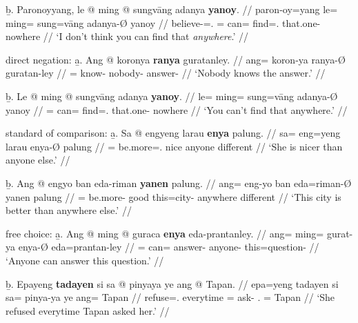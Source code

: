	\b{b.} \begingl
		\gla Paronoyyang, le @ ming @ sungvāng adanya \textbf{yanoy}. //
		\glb paron-oy=yang le= ming= sung=vāng adanya-Ø yanoy //
		\glc believe-\Neg{}=\Fsg{}.\Aarg{} \PatTI{}= can= 
			find=\Second{}.\Aarg{} that.one-\Top{} nowhere //
		\glft `I don't think you can find that \emph{anywhere}.' //
		\endgl
	\endsubsub

\a direct negation:\vspace{.5em} %
	\beginsubsub
	\b{a.} \begingl
		\gla Ang @ koronya \textbf{ranya} guratanley. //
		\glb ang= koron-ya ranya-Ø guratan-ley //
		\glc \AgtT{}= know-\TsgM{} nobody-\Top{} answer-\PargI{} //
		\glft `Nobody knows the answer.' //
		\endgl\vspace{.5em}
		
	\b{b.} \begingl
		\gla Le @ ming @ sungvāng adanya \textbf{yanoy}. //
		\glb le= ming= sung=vāng adanya-Ø yanoy //
		\glc \PatTI{}= can= find=\Second{}.\Aarg{} that.one-\Top{} nowhere //
		\glft `You can't find that anywhere.' //
		\endgl
	\endsubsub

\a standard of comparison:\vspace{.5em} %
	\beginsubsub
	\b{a.} \begingl
		\gla Sa @ engyeng larau \textbf{enya} palung. //
		\glb sa= eng=yeng larau enya-Ø palung //
		\glc \PatT{}= be.more=\TsgF{}.\Aarg{} nice anyone different //
		\glft `She is nicer than anyone else.' //
		\endgl\vspace{.5em}
		
	\b{b.} \begingl
		\gla Ang @ engyo ban eda-riman \textbf{yanen} palung. //
		\glb ang= eng-yo ban eda=riman-Ø yanen palung //
		\glc \AgtT{}= be.more-\TsgN{} good this=city-\Top{} anywhere 
			different //
		\glft `This city is better than anywhere else.' //
		\endgl
	\endsubsub

\a free choice:\vspace{.5em} %
	\beginsubsub
	\b{a.} \begingl
		\gla Ang @ ming @ guraca \textbf{enya} eda-prantanley. //
		\glb ang= ming= gurat-ya enya-Ø eda=prantan-ley //
		\glc \AgtT{}= can= answer-\TsgM{} anyone-\Top{} 
				this=question-\PargI{} //
		\glft `Anyone can answer this question.' //
		\endgl\vspace{.5em}
		
	\b{b.} \begingl
		\gla Epayeng \textbf{tadayen} si sa @ pinyaya ye ang @ Tapan. //
		\glb epa=yeng tadayen si sa= pinya-ya ye ang= Tapan //
		\glc refuse=\TsgF{}.\Aarg{} everytime \Rel{} \PatT{}=
				ask-\TsgM{} \TsgF{}.\Top{} \Aarg{}= Tapan //
		\glft `She refused everytime Tapan asked her.' //
		\endgl
	\endsubsub
	
